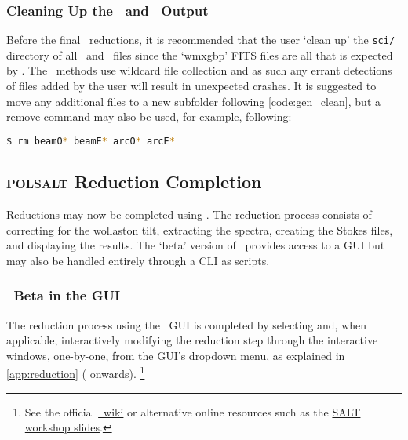 \subsubsection{Cleaning Up the \iraf\ and \stops\ Output}

Before the final \polsalt\ reductions, it is recommended that the user `clean up' the \texttt{sci/} directory of all \iraf\ and \stops\ files since the `wmxgbp' \gls{FITS} files are all that is expected by \polsalt. The \polsalt\ methods use wildcard file collection and as such any errant detections of files added by the user will result in unexpected crashes. It is suggested to move any additional files to a new subfolder following \autoref{code:gen_clean}, but a remove command may also be used, for example, following:
\begin{lstlisting}[language=bash]
$ rm beamO* beamE* arcO* arcE*
\end{lstlisting}

\subsection{\textsc{polsalt} Reduction Completion} \label{subsec:reduc_com}

Reductions may now be completed using \polsalt. The reduction process consists of correcting for the wollaston tilt, extracting the spectra, creating the Stokes files, and displaying the results. The `beta' version of \polsalt\ provides access to a \gls{GUI} but may also be handled entirely through a \gls{CLI} as scripts.

\subsubsection{\polsalt\ Beta in the \gls{GUI}}

The reduction process using the \polsalt\ \gls{GUI} is completed by selecting and, when applicable, interactively modifying the reduction step through the interactive windows, one-by-one, from the \gls{GUI}'s dropdown menu, as explained in \autoref{app:reduction} ( onwards).%
\footnote{See the official \href{https://github.com/saltastro/polsalt/wiki}{\polsalt\ wiki} or alternative online resources such as the \href{https://saltworkshop2022.salt.ac.za/wp-content/uploads/2022/11/DG_polsalt_SALT_workshop_2022_finalversion.pdf}{\gls{SALT} workshop slides}.}


